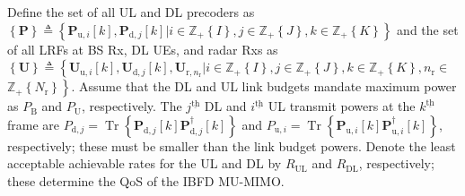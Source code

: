 \documentclass[9pt,journal]{IEEEtran}
\DeclareMathOperator{\trace}{Tr}
\newcommand{\bracket}[1]{{\left [{#1}\right ]}}
\newcommand{\braces}[1]{{\left\{ {#1}\right\}}}
\newcommand{\ith}[1]    {{#1}^{\underline{\text{th}}}}
\newcommand{\rr}{_\mathrm{r}}
\newcommand{\B}{\textrm{B}}
\newcommand{\rnr}{_{\mathrm{r},n_\mathrm{r}}}
\newcommand{\PiB}{\mathbf{P}_{\textrm{u},i}\bracket{k}}
\newcommand{\PiBH}{\mathbf{P}^\dagger_{\textrm{u},i}\bracket{k}}
\newcommand{\PBj}{\mathbf{P}_{\textrm{d},j}\bracket{k}}
\newcommand{\PBjH}{\mathbf{P}^\dagger_{\textrm{d},j}\bracket{k}}
\newcommand{\UiB}{\mathbf{U}_{\textrm{u},i}\bracket{k}}
\newcommand{\UBj}{\mathbf{U}_{\textrm{d},j}\bracket{k}}
\theoremstyle{definition}
\begin{document}
Define the set of all UL and DL precoders as %
$\braces{\mathbf{P}}\triangleq\braces{\PiB,\PBj | i\in\mathbb{Z}_+\braces{I}, j\in\mathbb{Z}_+\braces{J}, k\in\mathbb{Z}_+\braces{K}}$ 
and the set of all LRFs at BS Rx, DL UEs, and radar Rxs as 
$\braces{\mathbf{U}}\triangleq\left\lbrace\UiB, \UBj, \mathbf{U}\rnr | i\in\mathbb{Z}_+\braces{I}, j\in\mathbb{Z}_+\braces{J}, k\in\mathbb{Z}_+\braces{K},n\rr\in\right.$ $\left.\mathbb{Z}_+\braces{N\rr}\right\rbrace$. 
Assume that the DL and UL link budgets mandate maximum power as $\mathit{P}_\B$ and $\mathit{P}_{\textrm{U}}$, respectively. The $\ith{j}$ DL and $\ith{i}$ UL transmit powers at the $\ith{k}$ frame are $\mathit{P}_{\textrm{d},j}=\trace\braces{\PBj\PBjH}$ and $\mathit{P}_{\textrm{u},i}=\trace\braces{\PiB\PiBH}$, respectively; these must be smaller than the link budget powers. Denote the least acceptable achievable rates for the UL and DL by $\mathit{R}_{\textrm{UL}}$ and $\mathit{R}_{\textrm{DL}}$, respectively; these determine the QoS of the IBFD MU-MIMO.
\end{document}
